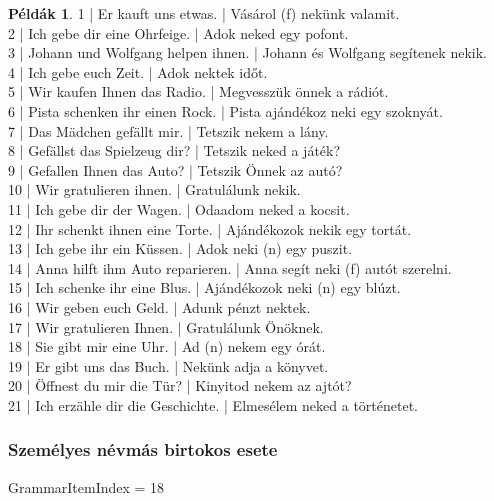 \documentclass{article}
\theoremstyle{definition}
\newtheorem*{exmp}{Példák}
\begin{document}
\begin{exmp}
1 | Er kauft uns etwas. | Vásárol (f) nekünk valamit.\\
2 | Ich gebe dir eine Ohrfeige. | Adok neked egy pofont.\\
3 | Johann und Wolfgang helpen ihnen. | Johann és Wolfgang segítenek nekik.\\
4 | Ich gebe euch Zeit. | Adok nektek időt.\\
5 | Wir kaufen Ihnen das Radio. | Megvesszük önnek a rádiót.\\
6 | Pista schenken ihr einen Rock. | Pista ajándékoz neki egy szoknyát.\\
7 | Das Mädchen gefällt mir. | Tetszik nekem a lány.\\
8 | Gefällst das Spielzeug dir? | Tetszik neked a játék?\\
9 | Gefallen Ihnen das Auto? | Tetszik Önnek az autó?\\
10 | Wir gratulieren ihnen. | Gratulálunk nekik.\\
11 | Ich gebe dir der Wagen. | Odaadom neked a kocsit.\\
12 | Ihr schenkt ihnen eine Torte. | Ajándékozok nekik egy tortát.\\
13 | Ich gebe ihr ein Küssen. | Adok neki (n) egy puszit.\\
14 | Anna hilft ihm Auto reparieren. | Anna segít neki (f) autót szerelni.\\
15 | Ich schenke ihr eine Blus. | Ajándékozok neki (n) egy blúzt.\\
16 | Wir geben euch Geld. | Adunk pénzt nektek.\\
17 | Wir gratulieren Ihnen. | Gratulálunk Önöknek.\\
18 | Sie gibt mir eine Uhr. | Ad (n) nekem egy órát.\\
19 | Er gibt uns das Buch. | Nekünk adja a könyvet.\\
20 | Öffnest du mir die Tür? | Kinyitod nekem az ajtót?\\
21 | Ich erzähle dir die Geschichte. | Elmesélem neked a történetet.\\
\end{exmp}

\subsubsection{Személyes névmás birtokos esete}

GrammarItemIndex = 18
\end{document}
